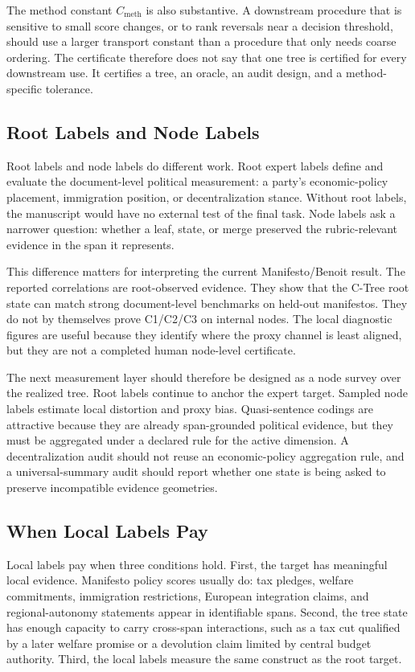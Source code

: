 The method constant \(C_{\mathrm{meth}}\) is also substantive. A downstream
procedure that is sensitive to small score changes, or to rank reversals near a
decision threshold, should use a larger transport constant than a procedure
that only needs coarse ordering. The certificate therefore does not say that
one tree is certified for every downstream use. It certifies a tree, an oracle,
an audit design, and a method-specific tolerance.

\subsection{Root Labels and Node Labels}

Root labels and node labels do different work. Root expert labels define and
evaluate the document-level political measurement: a party's economic-policy
placement, immigration position, or decentralization stance. Without root
labels, the manuscript would have no external test of the final task. Node
labels ask a narrower question: whether a leaf, state, or merge preserved the
rubric-relevant evidence in the span it represents.

This difference matters for interpreting the current Manifesto/Benoit result.
The reported correlations are root-observed evidence. They show that the C-Tree
root state can match strong document-level benchmarks on held-out manifestos.
They do not by themselves prove C1/C2/C3 on internal nodes. The local diagnostic
figures are useful because they identify where the proxy channel is least
aligned, but they are not a completed human node-level certificate.

The next measurement layer should therefore be designed as a node survey over
the realized tree. Root labels continue to anchor the expert target. Sampled
node labels estimate local distortion and proxy bias. Quasi-sentence codings
are attractive because they are already span-grounded political evidence, but
they must be aggregated under a declared rule for the active dimension. A
decentralization audit should not reuse an economic-policy aggregation rule,
and a universal-summary audit should report whether one state is being asked
to preserve incompatible evidence geometries.

\subsection{When Local Labels Pay}

Local labels pay when three conditions hold. First, the target has meaningful
local evidence. Manifesto policy scores usually do: tax pledges, welfare
commitments, immigration restrictions, European integration claims, and
regional-autonomy statements appear in identifiable spans. Second, the tree
state has enough capacity to carry cross-span interactions, such as a tax cut
qualified by a later welfare promise or a devolution claim limited by central
budget authority. Third, the local labels measure the same construct as the
root target.

